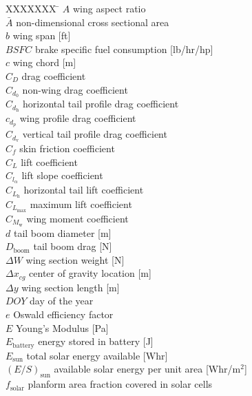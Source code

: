 \documentclass[]{aiaa-tc}%
\begin{document}
\begin{multicols}{2}
\small

\begin{tabbing}
  XXXXXXX \= \kill%
$A$ \> wing aspect ratio \\
$\bar{A}$ \> non-dimensional cross sectional area \\
$b$ \> wing span [ft] \\
$BSFC$ \> brake specific fuel consumption [lb/hr/hp] \\
$c$ \> wing chord [m] \\
$C_D$ \> drag coefficient \\
$C_{d_0}$ \> non-wing drag coefficient \\
$C_{d_{\text{h}}}$ \> horizontal tail profile drag coefficient \\
$c_{d_p}$ \> wing profile drag coefficient \\
$C_{d_{\text{v}}}$ \> vertical tail profile drag coefficient \\
$C_f$ \> skin friction coefficient \\
$C_L$ \> lift coefficient \\
$C_{l_{\alpha}}$ \> lift slope coefficient \\
$C_{L_{\text{h}}}$ \> horizontal tail lift coefficient \\
$C_{L_{\text{max}}}$ \> maximum lift coefficient \\
$C_{M_{\text{w}}}$ \> wing moment coefficient \\
$d$ \> tail boom diameter [m] \\
$D_{\text{boom}}$ \> tail boom drag [N] \\
$\Delta W$ \> wing section weight [N] \\
$\Delta x_{cg}$ \> center of gravity location [m] \\
$\Delta y$ \> wing section length [m] \\
$DOY$ \> day of the year \\
$e$ \> Oswald efficiency factor \\
$E$ \> Young's Modulus [Pa] \\
$E_{\text{battery}}$ \> energy stored in battery [J] \\
$E_{\text{sun}}$ \> total solar energy available [Whr] \\
$(E/S)_{\text{sun}}$ \> available solar energy per unit area [Whr/m$^2$] \\
$f_{\text{solar}}$ \> planform area fraction covered in solar cells \\

\end{tabbing}
\end{multicols}
\end{document}
